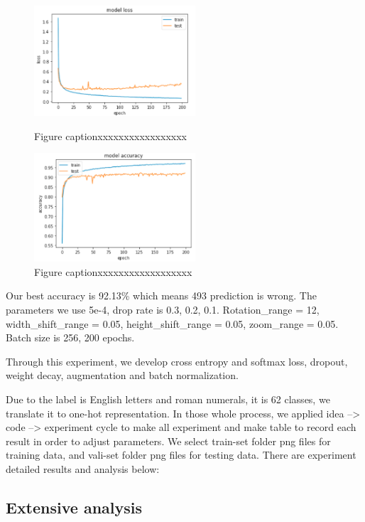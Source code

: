 \documentclass[twoside,twocolumn,10.8pt]{article}
\begin{document}
\begin{figure}[h]
\includegraphics[width=6cm]{model_loss.png}
\centering
\caption{Figure captionxxxxxxxxxxxxxxxxx}\label{fig1}

\includegraphics[width=6cm]{model_acc.png}
\centering
\caption{Figure captionxxxxxxxxxxxxxxxxxx}\label{fig2}
\end{figure}



\noindent Our best accuracy is 92.13\% which means 493 prediction is wrong. The parameters we use 5e-4, drop rate is 0.3, 0.2, 0.1. Rotation\_range = 12, width\_shift\_range = 0.05, height\_shift\_range = 0.05, zoom\_range = 0.05. Batch size is 256, 200 epochs.


\noindent Through this experiment, we develop cross entropy and softmax loss, dropout, weight decay, augmentation and batch normalization.


\noindent Due to the label is English letters and roman numerals, it is 62 classes, we translate it to one-hot representation. In those whole process, we applied idea --> code --> experiment cycle to make all experiment and make table to record each result in order to adjust parameters. 
We select train-set folder png files for training data, and vali-set folder png files for testing data. There are experiment detailed results and analysis below:

\subsection{Extensive analysis}
\end{document}
